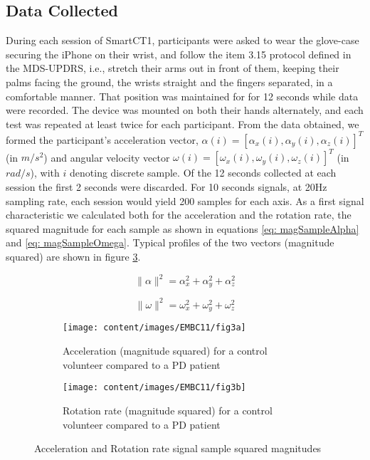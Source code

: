 \subsection{Data Collected}
\label{subsec:SmartCT1Data}
During each session of \gls{SmartCT1}, participants were asked to wear the glove-case securing the iPhone on their wrist, and follow the item 3.15 protocol defined in the \gls{MDS}-\gls{UPDRS}, i.e., stretch their arms out in front of them, keeping their palms facing the ground, the wrists straight and the fingers separated, in a comfortable manner. That position was maintained for for 12 seconds while data were recorded. The device was mounted on both their hands alternately, and each test was repeated at least twice for each participant. From the data obtained, we formed the participant's acceleration vector, $\alpha(i) = [\alpha_{x}(i),\alpha_{y}(i),\alpha_{z}(i)]^{T}$ (in $m/s^{2}$) and angular velocity vector $\omega(i) = [\omega_{x}(i),\omega_{y}(i),\omega_{z}(i)]^{T}$ (in $rad/s$), with $i$ denoting discrete sample. Of the 12 seconds collected at each session the first 2 seconds were discarded. For 10 seconds signals, at 20Hz sampling rate, each session would yield 200 samples for each axis. As a first signal characteristic we calculated both for the acceleration and the rotation rate, the squared magnitude for each sample as shown in equations \ref{eq: magSampleAlpha} and \ref{eq: magSampleOmega}. Typical profiles of the two vectors (magnitude squared) are shown in figure \ref{fig:signals}.

\begin{equation} \label{eq: magSampleAlpha}
\|\alpha\|^{2} = \alpha_{x}^{2} + \alpha_{y}^{2} + \alpha_{z}^{2}
\end{equation}

\begin{equation} \label{eq: magSampleOmega}
\|\omega\|^{2} = \omega_{x}^{2} + \omega_{y}^{2} + \omega_{z}^{2}
\end{equation}

\begin{figure}[h]
\centering
\begin{subfigure}{1\textwidth}
  \centering
  \texttt{[image: content/images/EMBC11/fig3a]}
  \caption{Acceleration (magnitude squared) for a control volunteer compared to a \gls{PD} patient}
  \label{fig:accelSig}
\end{subfigure}

\begin{subfigure}{1\textwidth}
  \centering
  \texttt{[image: content/images/EMBC11/fig3b]}
  \caption{Rotation rate (magnitude squared) for a control volunteer compared to a \gls{PD} patient}
  \label{fig:rotSig}
\end{subfigure}
\caption{Acceleration and Rotation rate signal sample squared magnitudes}
\label{fig:signals}
\end{figure}

